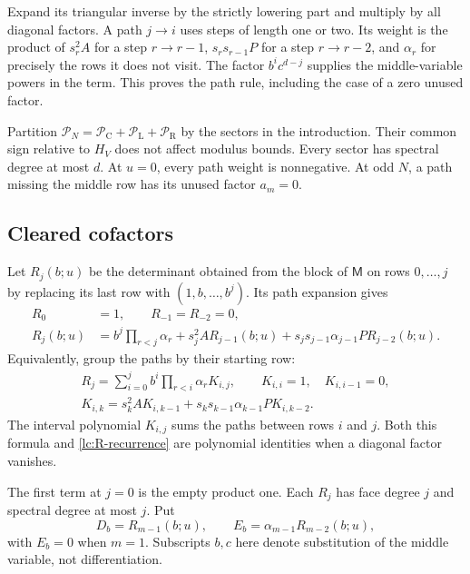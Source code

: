 Expand its triangular inverse by the strictly lowering part and
multiply by all diagonal factors. A path \(j\to i\) uses steps of length
one or two. Its weight is the product of \(s_r^2A\) for a step
\(r\to r-1\), \(s_rs_{r-1}P\) for a step \(r\to r-2\), and
\(\alpha_r\) for precisely the rows it does not visit.
The factor $b^ic^{d-j}$ supplies the middle-variable powers in the term.
This proves the path rule, including the case of a zero unused factor.

Partition \(\mathcal P_N=\mathcal P_{\mathrm C}+\mathcal P_{\mathrm L}
+\mathcal P_{\mathrm R}\) by the sectors in the introduction.
Their common sign relative to \(H_V\) does not affect modulus bounds.
Every sector has spectral degree at most \(d\). At \(u=0\), every
path weight is nonnegative. At odd \(N\), a path missing the middle
row has its unused factor \(a_m=0\).



\subsection{Cleared cofactors}
Let \(R_j(b;u)\) be the determinant obtained from the block of
\(\mathsf M\) on rows \(0,\ldots,j\) by replacing its last row with
\((1,b,\ldots,b^j)\). Its path expansion gives
\begin{equation}\label{lc:R-recurrence}
\begin{split}
 R_0&=1,\qquad R_{-1}=R_{-2}=0,\\
 R_j(b;u)&=b^j\prod_{r<j}\alpha_r+s_j^2A R_{j-1}(b;u)
                +s_js_{j-1}\alpha_{j-1}P R_{j-2}(b;u).
\end{split}
\end{equation}\aliascurrentequation{\label{sa:R}}
Equivalently, group the paths by their starting row:
\begin{equation}\label{sa:path}
 \begin{gathered}
 R_j=\sum_{i=0}^j b^i\prod_{r<i}\alpha_r K_{i,j},\qquad
 K_{i,i}=1,\quad K_{i,i-1}=0,\\
 K_{i,k}=s_k^2A K_{i,k-1}+s_ks_{k-1}\alpha_{k-1}P K_{i,k-2}.
 \end{gathered}
\end{equation}
The interval polynomial $K_{i,j}$ sums the paths between rows $i$ and $j$.
Both this formula and \eqref{lc:R-recurrence} are polynomial identities
when a diagonal factor vanishes.

The first term at \(j=0\) is the empty product one. Each \(R_j\)
has face degree \(j\) and spectral degree at most \(j\). Put
\[
 D_b=R_{m-1}(b;u),\qquad E_b=\alpha_{m-1}R_{m-2}(b;u),
\]
with \(E_b=0\) when \(m=1\). Subscripts \(b,c\) here denote substitution
of the middle variable, not differentiation.

